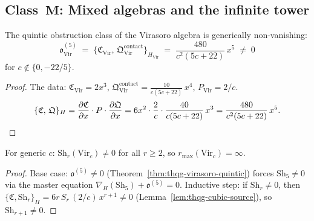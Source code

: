 
\subsection{Class~$\mathbf{M}$: Mixed algebras and the infinite tower}
\label{subsec:thqg-mixed}

\begin{theorem}
\label{thm:thqg-virasoro-quintic}
\ClaimStatusProvedHere
{}
The quintic obstruction class of the Virasoro algebra is
generically non-vanishing:
\begin{equation}\label{eq:thqg-virasoro-quintic}
\mathfrak{o}^{(5)}_{\mathrm{Vir}}
\;=\;
\{\mathfrak{C}_{\mathrm{Vir}},\,
\mathfrak{Q}^{\mathrm{contact}}_{\mathrm{Vir}}\}_{H_{\mathrm{Vir}}}
\;=\;
\frac{480}{c^2(5c+22)}\,x^5
\;\neq\; 0
\end{equation}
for $c \notin \{0, -22/5\}$.
\end{theorem}

\begin{proof}
The data: $\mathfrak{C}_{\mathrm{Vir}} = 2x^3$,\;
$\mathfrak{Q}^{\mathrm{contact}}_{\mathrm{Vir}} =
\frac{10}{c(5c+22)}\,x^4$,\;
$P_{\mathrm{Vir}} = 2/c$.
\[
\{\mathfrak{C},\, \mathfrak{Q}\}_{H}
= \frac{\partial\mathfrak{C}}{\partial x}
 \cdot P \cdot
 \frac{\partial\mathfrak{Q}}{\partial x}
= 6x^2 \cdot \frac{2}{c} \cdot
 \frac{40}{c(5c+22)}\,x^3
= \frac{480}{c^2(5c+22)}\,x^5.
\qedhere
\]
\end{proof}

\begin{theorem}
\label{thm:thqg-virasoro-infinite}
\ClaimStatusProvedHere
{}
For generic $c$: $\mathrm{Sh}_r(\mathrm{Vir}_c) \neq 0$
for all $r \geq 2$, so $r_{\max}(\mathrm{Vir}_c) = \infty$.
\end{theorem}

\begin{proof}
Base case: $\mathfrak{o}^{(5)} \neq 0$
(Theorem~\ref{thm:thqg-virasoro-quintic}) forces
$\mathrm{Sh}_5 \neq 0$ via the master equation
$\nabla_H(\mathrm{Sh}_5) + \mathfrak{o}^{(5)} = 0$.
Inductive step: if $\mathrm{Sh}_r \neq 0$, then
$\{\mathfrak{C}, \mathrm{Sh}_r\}_H =
6r\,S_r\,(2/c)\,x^{r+1} \neq 0$
(Lemma~\ref{lem:thqg-cubic-source}), so
$\mathrm{Sh}_{r+1} \neq 0$.
\end{proof}


